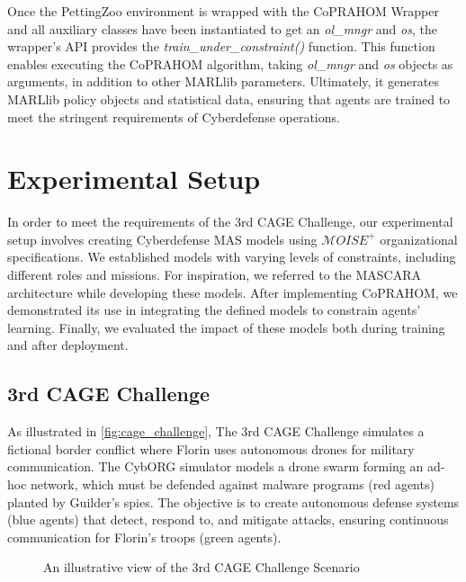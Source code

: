 Once the PettingZoo environment is wrapped with the CoPRAHOM Wrapper and all auxiliary classes have been instantiated to get an \textit{ol\_mngr} and \textit{os}, the wrapper's API provides the \textit{train\_under\_constraint()} function. This function enables executing the CoPRAHOM algorithm, taking \textit{ol\_mngr} and \textit{os} objects as arguments, in addition to other MARLlib parameters. Ultimately, it generates MARLlib policy objects and statistical data, ensuring that agents are trained to meet the stringent requirements of Cyberdefense operations.

\section{Experimental Setup}\label{sec:experimental_setup}

In order to meet the requirements of the 3rd CAGE Challenge, our experimental setup involves creating Cyberdefense MAS models using $\mathcal{M}OISE^+$ organizational specifications. We established models with varying levels of constraints, including different roles and missions. For inspiration, we referred to the MASCARA architecture while developing these models. After implementing CoPRAHOM, we demonstrated its use in integrating the defined models to constrain agents' learning. Finally, we evaluated the impact of these models both during training and after deployment.

\subsection{3rd CAGE Challenge}

As illustrated in \autoref{fig:cage_challenge},
The 3rd CAGE Challenge simulates a fictional border conflict where Florin uses autonomous drones for military communication. The CybORG simulator models a drone swarm forming an ad-hoc network, which must be defended against malware programs (red agents) planted by Guilder's spies. The objective is to create autonomous defense systems (blue agents) that detect, respond to, and mitigate attacks, ensuring continuous communication for Florin's troops (green agents).

\begin{figure}
    \centering
    
    \caption{An illustrative view of the 3rd CAGE Challenge Scenario}\label{fig:cage_challenge}
\end{figure}

